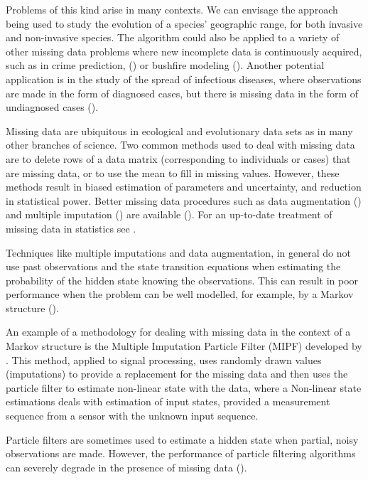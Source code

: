 Problems of this kind arise in many contexts. We can envisage the approach being used to study the evolution of a species' geographic range, for both invasive and non-invasive species. The algorithm could also be applied to a variety of other missing data problems where new incomplete data is continuously acquired, such as in crime prediction, (\cite{Malathy}) or bushfire modeling (\cite{Beer}). Another potential application is in the study of the spread of infectious diseases, where observations are made in the form of diagnosed cases, but there is missing data in the form of undiagnosed cases (\cite{O'Neill}). 

Missing data are ubiquitous in ecological and evolutionary data sets as in many other branches of science. Two common methods used to deal with missing data are to delete rows of a data matrix (corresponding to individuals or cases) that are missing data, or to use the mean to fill in missing values. However, these methods result in biased estimation of parameters and uncertainty, and reduction in statistical power. Better missing data procedures such as data augmentation (\cite{Tanner}) and multiple imputation (\cite{RubinMI}) are available  (\cite{Nakagawa}).
{\color{blue} For an up-to-date treatment of missing data in statistics see \cite{Little}}.

{\color{blue}Techniques like multiple imputations and data augmentation, in general do not use past observations and the state transition equations when estimating the probability of the hidden state knowing the observations. This can result in poor performance when the problem can be well modelled, for example, by a Markov structure (\cite{Zhang}).}

{\color{blue} An example of a methodology for dealing with missing data in the context of a Markov structure} is the Multiple Imputation Particle Filter (MIPF) developed by \cite{Zhang}. This method, {\color{blue}applied to signal processing}, uses randomly drawn values (imputations) to provide a replacement for the missing data and then uses the particle filter to estimate non-linear state with the data, where a {\color{blue} Non-linear state estimations deals with estimation of input states, provided a measurement sequence from a sensor with the unknown input sequence.}

Particle filters are sometimes used to estimate a hidden state when partial, noisy observations are made. However, the performance of particle filtering algorithms can severely degrade in the presence of missing data (\cite{Zhang}).

